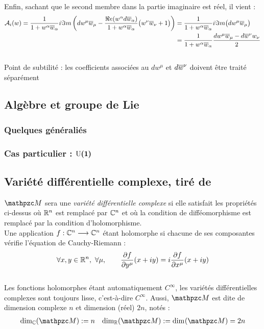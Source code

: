 \begin{annexe}
\begin{align*}
\end{align*}
\\
Enfin, sachant que le second membre dans la partie imaginaire est réel, il vient :
\begin{align*}
	\mathcal{A}_i(w) = \frac{1}{1 + w^\alpha\overline{w}_\alpha} i\Im m \left( dw^\mu\overline{w}_\mu -  \frac{\Re e(w^\alpha d\overline{w}_\alpha)}{1 + w^\alpha\overline{w}_\alpha}\big( w^\nu\overline{w}_\nu +1 \big) \right) 
	&= \frac{1}{1 + w^\alpha\overline{w}_\alpha} i\Im m \big( dw^\mu\overline{w}_\mu \big) \\
	&= \frac{1}{1 + w^\alpha\overline{w}_\alpha} \frac{dw^\mu\overline{w}_\mu -  d\overline{w}^\nu w_\nu }{2}
\end{align*}
\\

Point de subtilité : les coefficients associées au $dw^\mu$ et $d\overline{w}^\nu$ doivent être traité séparément


\subsection{Algèbre et groupe de Lie} \label{ann:2Lie}

\subsubsection{Quelques généraliés}

\subsubsection{Cas particulier : $\boldsymbol{\text{\normalfont U}(1)}$}



\subsection{Variété différentielle complexe, tiré de \cite{nakahara_geometry_2003}}\label{ann:VDC}


$\manu$ sera une \emph{variété différentielle complexe} si elle satisfait les propriétés ci-dessus où $\mathbb{R}^n$ est remplacé par $\mathbb{C}^n$ et où la condition de difféomorphisme est remplacé par la condition d'holomorphisme. 
\\
Une application $f : \mathbb{C}^n\longrightarrow \mathbb{C}^n$ étant holomorphe si chacune de ses composantes vérifie l'équation de Cauchy-Riemann :
\[\forall x,y\in\R^n,\ \forall \mu,\qquad \frac{\partial f }{\partial y^\mu}(x+iy) = i \frac{\partial f }{\partial x^\mu}(x+iy)\]
\\
Les fonctions holomorphes étant automatiquement $C^\infty$, les variétés différentielles complexes sont toujours lisse, c'est-à-dire $C^\infty$. Aussi, $\manu$ est dite de dimension complexe $n$ et dimension (réel) $2n$, notés :
\begin{align}\label{eq:manuC-base_cano}
	\dim[\C](\manu) &\defeq n  &  \dim[\R] (\manu) \defeq \dim (\manu) = 2n
\end{align}
\\


\end{annexe}
